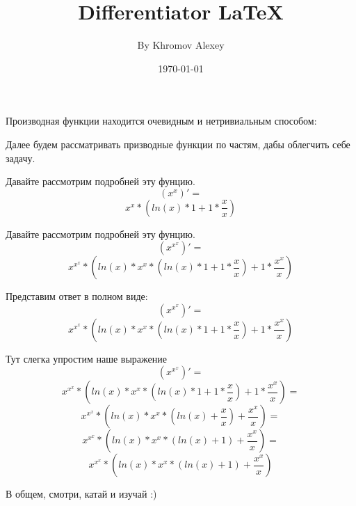 \documentclass[a4paper,12pt]{article}
\author{By Khromov Alexey}
\title{Differentiator \LaTeX{}}
\date{\today}
\begin{document}
\maketitle
\newpage
Производная функции находится очевидным и нетривиальным способом:

Далее будем рассматривать призводные функции по частям, дабы облегчить себе задачу.

Давайте рассмотрим подробней эту фунцию.
\begin{equation}
\left( {x }^ {x }\right)' =
\end{equation}
\begin{equation}
{{x }^ {x }}* {\left( {{ln \left( {x }\right) }* {1 }}+ {{1 }* {\frac{{x }}{{x }}}}\right) }
\end{equation}

Давайте рассмотрим подробней эту фунцию.
\begin{equation}
\left( {x }^ {{x }^ {x }}\right)' =
\end{equation}
\begin{equation}
{{x }^ {{x }^ {x }}}* {\left( {{ln \left( {x }\right) }* {{{x }^ {x }}* {\left( {{ln \left( {x }\right) }* {1 }}+ {{1 }* {\frac{{x }}{{x }}}}\right) }}}+ {{1 }* {\frac{{{x }^ {x }}}{{x }}}}\right) }
\end{equation}

Представим ответ в полном виде:
\begin{equation}
\left( {x }^ {{x }^ {x }}\right)' =
\end{equation}
\begin{equation}
{{x }^ {{x }^ {x }}}* {\left( {{ln \left( {x }\right) }* {{{x }^ {x }}* {\left( {{ln \left( {x }\right) }* {1 }}+ {{1 }* {\frac{{x }}{{x }}}}\right) }}}+ {{1 }* {\frac{{{x }^ {x }}}{{x }}}}\right) }
\end{equation}

Тут слегка упростим наше выражение
\begin{equation}
\left( {x }^ {{x }^ {x }}\right)' =
\end{equation}
\begin{equation}
{{x }^ {{x }^ {x }}}* {\left( {{ln \left( {x }\right) }* {{{x }^ {x }}* {\left( {{ln \left( {x }\right) }* {1 }}+ {{1 }* {\frac{{x }}{{x }}}}\right) }}}+ {{1 }* {\frac{{{x }^ {x }}}{{x }}}}\right) }=
\end{equation}
\begin{equation}
{{x }^ {{x }^ {x }}}* {\left( {{ln \left( {x }\right) }* {{{x }^ {x }}* {\left( {ln \left( {x }\right) }+ {\frac{{x }}{{x }}}\right) }}}+ {\frac{{{x }^ {x }}}{{x }}}\right) }=
\end{equation}
\begin{equation}
{{x }^ {{x }^ {x }}}* {\left( {{ln \left( {x }\right) }* {{{x }^ {x }}* {\left( {ln \left( {x }\right) }+ {1 }\right) }}}+ {\frac{{{x }^ {x }}}{{x }}}\right) }=
\end{equation}
\begin{equation}
{{x }^ {{x }^ {x }}}* {\left( {{ln \left( {x }\right) }* {{{x }^ {x }}* {\left( {ln \left( {x }\right) }+ {1 }\right) }}}+ {\frac{{{x }^ {x }}}{{x }}}\right) }
\end{equation}

В общем, смотри, катай и изучай :)
\end{document}
